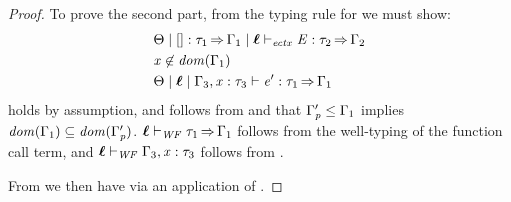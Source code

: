\begin{proof}
  To prove the second part, from the typing rule for  we must show:
  \begin{align}
    & \Theta  \mid  \HOLE  \ottsym{:}  \tau_{{\mathrm{1}}}  \produces  \Gamma_{{\mathrm{1}}}  \mid  \oldvec{\ell}  \vdash_{\mathit{ectx} }  \ottnt{E}  \ottsym{:}  \tau_{{\mathrm{2}}}  \produces  \Gamma_{{\mathrm{2}}} \label{eqn:context-well-typed} \\
    &  \mathit{x}  \not\in   \DOM( \Gamma_{{\mathrm{1}}} )   \label{eqn:x-not-free} \\
    &  \Theta   \mid   \oldvec{\ell}   \mid   \Gamma_{{\mathrm{3}}}  \ottsym{,}  \mathit{x}  \ottsym{:}  \tau_{{\mathrm{3}}}   \vdash   \ottnt{e'}  :  \tau_{{\mathrm{1}}}   \produces   \Gamma_{{\mathrm{1}}}  \label{eqn:let-body-sub-typed}
  \end{align}
   holds by assumption, and  follows from
   and that $\Gamma'_{\mathit{p}}  \leq  \Gamma_{{\mathrm{1}}}$ implies $  \mathit{dom}( \Gamma_{{\mathrm{1}}} )   \subseteq   \mathit{dom}( \Gamma'_{\mathit{p}} )  $.
  $ \oldvec{\ell}   \vdash _{\wf}  \tau_{{\mathrm{1}}}   \produces   \Gamma_{{\mathrm{1}}} $ follows from the well-typing of the function call term,
  and $ \oldvec{\ell}   \vdash _{\wf}  \Gamma_{{\mathrm{3}}}  \ottsym{,}  \mathit{x}  \ottsym{:}  \tau_{{\mathrm{3}}} $ follows from .

  From  we then have
   via an application of .
\end{proof}

